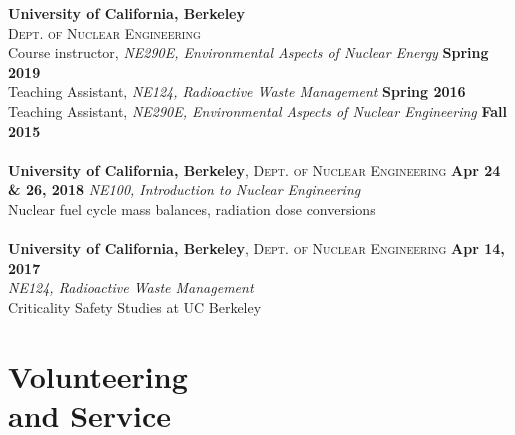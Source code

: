 \documentclass[margin,line]{resume}
\begin{document}
\begin{resume}
\textbf{University of California, Berkeley} \\
\textsc{Dept. of Nuclear Engineering} \\
Course instructor, \textsl{NE290E, Environmental Aspects of Nuclear Energy}
    \hfill \textbf{Spring 2019} \\
Teaching Assistant, \textsl{NE124, Radioactive Waste Management} 
    \hfill \textbf{Spring 2016} \\
Teaching Assistant, \textsl{NE290E, Environmental Aspects of Nuclear Engineering} \hfill \textbf{Fall 2015}\\
\vspace{0mm}\\
\textbf{University of California, Berkeley}, \textsc{Dept. of Nuclear Engineering} 
    \hfill \textbf{Apr 24 \& 26, 2018}
    \textsl{NE100, Introduction to Nuclear Engineering} \\
    Nuclear fuel cycle mass balances, radiation dose conversions\\
\vspace{0mm} \\ 
\textbf{University of California, Berkeley}, \textsc{Dept. of Nuclear Engineering} \hfill \textbf{Apr 14, 2017} \\
    \textsl{NE124, Radioactive Waste Management} \\
    Criticality Safety Studies at UC Berkeley \\
    

\section{\mysidestyle Volunteering\\and Service}


\end{resume}
\end{document}

